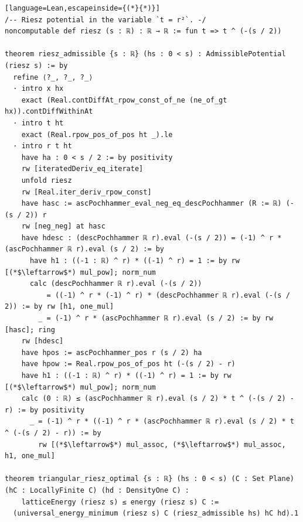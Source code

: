 \begin{leanbox}
\begin{lstlisting}[language=Lean,escapeinside={(*}{*)}]
/-- Riesz potential in the variable `t = r²`. -/
noncomputable def riesz (s : ℝ) : ℝ → ℝ := fun t => t ^ (-(s / 2))

theorem riesz_admissible {s : ℝ} (hs : 0 < s) : AdmissiblePotential (riesz s) := by
  refine ⟨?_, ?_, ?_⟩
  · intro x hx
    exact (Real.contDiffAt_rpow_const_of_ne (ne_of_gt hx)).contDiffWithinAt
  · intro t ht
    exact (Real.rpow_pos_of_pos ht _).le
  · intro r t ht
    have ha : 0 < s / 2 := by positivity
    rw [iteratedDeriv_eq_iterate]
    unfold riesz
    rw [Real.iter_deriv_rpow_const]
    have hasc := ascPochhammer_eval_neg_eq_descPochhammer (R := ℝ) (-(s / 2)) r
    rw [neg_neg] at hasc
    have hdesc : (descPochhammer ℝ r).eval (-(s / 2)) = (-1) ^ r * (ascPochhammer ℝ r).eval (s / 2) := by
      have h1 : ((-1 : ℝ) ^ r) * ((-1) ^ r) = 1 := by rw [(*$\leftarrow$*) mul_pow]; norm_num
      calc (descPochhammer ℝ r).eval (-(s / 2))
          = ((-1) ^ r * (-1) ^ r) * (descPochhammer ℝ r).eval (-(s / 2)) := by rw [h1, one_mul]
        _ = (-1) ^ r * (ascPochhammer ℝ r).eval (s / 2) := by rw [hasc]; ring
    rw [hdesc]
    have hpos := ascPochhammer_pos r (s / 2) ha
    have hpow := Real.rpow_pos_of_pos ht (-(s / 2) - r)
    have h1 : ((-1 : ℝ) ^ r) * ((-1) ^ r) = 1 := by rw [(*$\leftarrow$*) mul_pow]; norm_num
    calc (0 : ℝ) ≤ (ascPochhammer ℝ r).eval (s / 2) * t ^ (-(s / 2) - r) := by positivity
      _ = (-1) ^ r * ((-1) ^ r * (ascPochhammer ℝ r).eval (s / 2) * t ^ (-(s / 2) - r)) := by
        rw [(*$\leftarrow$*) mul_assoc, (*$\leftarrow$*) mul_assoc, h1, one_mul]

theorem triangular_riesz_optimal {s : ℝ} (hs : 0 < s) (C : Set Plane) (hC : LocallyFinite C) (hd : DensityOne C) :
    latticeEnergy (riesz s) ≤ energy (riesz s) C :=
  (universal_energy_minimum (riesz s) C (riesz_admissible hs) hC hd).1
\end{lstlisting}
\end{leanbox}

